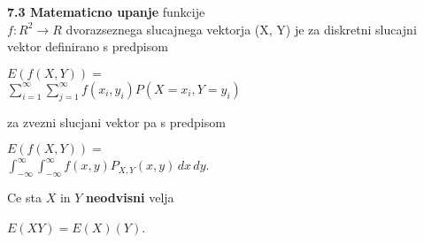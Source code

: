 \documentclass{article}
\begin{document}
\begin{multicols}{3}
\textbf{7.3 Matematicno upanje} funkcije\\
$f: R^2 \rightarrow R$ dvorazseznega slucajnega vektorja (X, Y) je 
za diskretni slucajni vektor definirano s predpisom
\begin{center}
    \begin{math}
        E(f(X,Y)) = 
    \end{math}\\
    \begin{math}
        \sum_{i=1}^{\infty}\sum_{j=1}^{\infty} f(x_i, y_i) P(X = x_i, Y = y_i)
    \end{math}
\end{center}
za zvezni slucjani vektor pa s predpisom
\begin{center}
    \begin{math}
        E(f(X,Y)) = 
    \end{math}\\
    \begin{math}
        \int_{-\infty}^{\infty}\int_{-\infty}^{\infty} f(x, y) P_{X,Y}(x,y)\,dx\,dy
    \end{math}.
\end{center}
Ce sta $X$ in $Y$ \textbf{neodvisni} velja
\begin{center}
    \begin{math}
        E(XY) = E(X)(Y)
    \end{math}.
\end{center}


\end{multicols}
\end{document}
